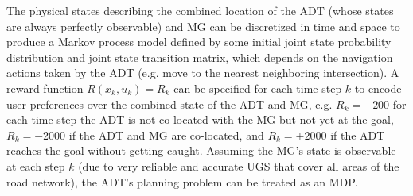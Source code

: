 The physical states describing the combined location of the ADT (whose states are always perfectly observable) and MG can be discretized in time and space to produce a Markov process model defined by some initial joint state probability distribution and joint state transition matrix, which depends on the navigation actions taken by the ADT (e.g. move to the nearest neighboring intersection).
A reward function $R(x_k,u_k) = R_k$ can be specified for each time step $k$ to encode user preferences over the combined state of the ADT and MG, e.g. $R_k = -200$ for each time step the ADT is not co-located with the MG but not yet at the goal, $R_k= -2000$ if the ADT and MG are co-located, and $R_k=+2000$ if the ADT reaches the goal without getting caught. 
Assuming the MG's state is observable at each step $k$ (due to very reliable and accurate UGS that cover all areas of the road network), the ADT's planning problem can be treated as an MDP. 
